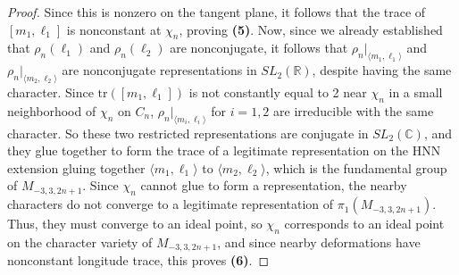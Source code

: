 \documentclass[10pt,a4paper]{amsart}
\begin{document}
\begin{proof}
Since this is nonzero on the tangent plane, it follows that the trace of $[m_1, \ell_1]$ is nonconstant at $\chi_n$, proving \textbf{(5)}. Now, since we already established that $\rho_n(\ell_1)$ and $\rho_n(\ell_2)$ are nonconjugate, it follows that $\rho_n|_{\langle m_1, \ell_1 \rangle}$ and $\rho_n|_{\langle m_2, \ell_2 \rangle}$ are nonconjugate representations in $SL_2(\mathbb{R})$, despite having the same character. Since $\text{tr}([m_1, \ell_1])$ is not constantly equal to 2 near $\chi_n$ in a small neighborhood of $\chi_n$ on $C_n$, $\rho_n|_{\langle m_i, \ell_i \rangle}$ for $i = 1, 2$ are irreducible with the same character. So these two restricted representations are conjugate in $SL_2(\mathbb{C})$, and they glue together to form the trace of a legitimate representation on the HNN extension gluing together $\langle m_1, \ell_1 \rangle$ to $\langle m_2, \ell_2 \rangle$, which is the fundamental group of $M_{-3, 3, 2n+1}$. Since $\chi_n$ cannot glue to form a representation, the nearby characters do not converge to a legitimate representation of $\pi_1(M_{-3, 3, 2n+1})$. Thus, they must converge to an ideal point, so $\chi_n$ corresponds to an ideal point on the character variety of $M_{-3, 3, 2n+1}$, and since nearby deformations have nonconstant longitude trace, this proves \textbf{(6)}. 
\end{proof}
\end{document}
